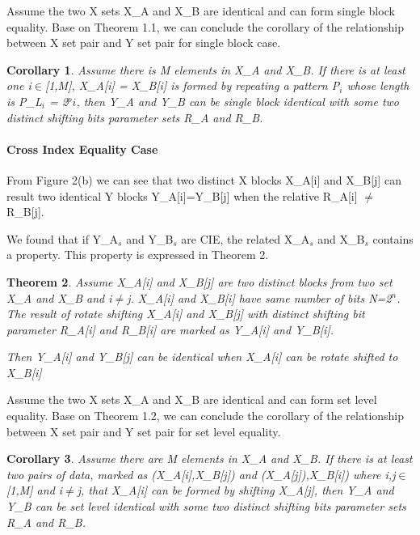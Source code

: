 \documentclass{article}
\newtheorem{theorem}{Theorem}[section]
\newtheorem{corollary}[theorem]{Corollary}
\begin{document}
Assume the two X sets X\_A and X\_B are identical and can  form single block equality. Base on Theorem 1.1, we can conclude the corollary of the relationship between X set pair and Y set pair for single block case. 
\begin{corollary}
Assume there is M elements in X\_A and X\_B. If there is at least one i$\in$[1,M], X\_A[i] = X\_B[i] is formed by repeating a pattern P$_i$ whose length is P\_L$_i$ = 2$^pi$, then Y\_A and Y\_B can be single block identical with some two distinct shifting bits parameter sets R\_A and R\_B.
\end{corollary} 

\paragraph{Cross Index Equality Case}
From Figure 2(b) we can see that two distinct X blocks X\_A[i] and X\_B[j] can result two identical Y blocks Y\_A[i]=Y\_B[j] when the relative R\_A[i] $\neq$ R\_B[j]. 



We found that if Y\_A$_s$ and Y\_B$_s$ are CIE, the related X\_A$_s$ and X\_B$_s$ contains a property. 
This property is expressed in Theorem 2.

\begin{theorem}
Assume X\_A[i] and X\_B[j] are two distinct blocks from two set X\_A and X\_B and i$\neq$j. X\_A[i] and X\_B[i] have same number of bits N=2$^n$. 
The result of rotate shifting X\_A[i] and X\_B[j] with distinct shifting bit parameter R\_A[i] and R\_B[i] are marked as Y\_A[i] and Y\_B[i]. 

Then Y\_A[i] and Y\_B[j] can be identical when X\_A[i] can be rotate shifted to X\_B[i]
\end{theorem}

Assume the two X sets X\_A and X\_B are identical and can form set level equality. Base on Theorem 1.2, we can conclude the corollary of the relationship between X set pair and Y set pair for set level equality. 
\begin{corollary}
Assume there are M elements in X\_A and X\_B. If there is at least two pairs of data, marked as (X\_A[i],X\_B[j]) and (X\_A[j]),X\_B[i]) where i,j$\in$[1,M] and i$\neq$j, that X\_A[i] can be formed by shifting X\_A[j], then Y\_A and Y\_B can be set level identical with some two distinct shifting bits parameter sets R\_A and R\_B.
\end{corollary} 
\end{document}
